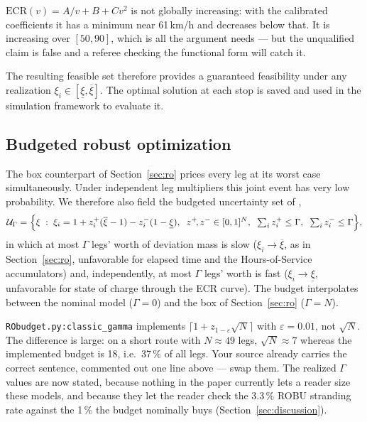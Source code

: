\begin{acode}
$\mathrm{ECR}(v) = A/v + B + Cv^2$ is not globally increasing: with the calibrated
coefficients it has a minimum near 61\,km/h and decreases below that. It is
increasing over $[50,90]$, which is all the argument needs --- but the unqualified
claim is false and a referee checking the functional form will catch it.
\end{acode}

The resulting feasible set therefore provides a guaranteed feasibility under any realization $\xi_i \in {[\underline\xi, \overline\xi]}$.
The optimal solution at each stop is saved and used in the simulation framework to evaluate it.

\subsection{Budgeted robust optimization} \label{sec:robu}
The box counterpart of Section~\ref{sec:ro} prices every leg at its worst case simultaneously. Under independent leg multipliers this joint event has very low probability. We therefore also field the budgeted uncertainty set of \citet{bertsimas_price_2004},
\[
  \mathcal U_\Gamma = \Bigl\{ \xi \;:\; \xi_i = 1 + z_i^{+}(\overline\xi - 1) - z_i^{-}(1-\underline\xi),
  \;\; z^{+}\!, z^{-} \in [0,1]^N,
  \;\; \textstyle\sum_i z_i^{+} \le \Gamma,
  \;\; \sum_i z_i^{-} \le \Gamma \Bigr\},
\]
in which at most $\Gamma$ legs' worth of deviation mass is slow ($\xi_i \to \overline\xi$, as in Section~\ref{sec:ro}, unfavorable for elapsed time and the Hours-of-Service accumulators) and, independently, at most $\Gamma$ legs' worth is fast ($\xi_i \to \underline\xi$, unfavorable for state of charge through the ECR curve).
The budget interpolates between the nominal model ($\Gamma = 0$) and the box of Section~\ref{sec:ro} ($\Gamma = N$).

\begin{acode}
\texttt{RObudget.py:classic\_gamma} implements
$\lceil 1 + z_{1-\varepsilon}\sqrt N\rceil$ with $\varepsilon = 0.01$, not
$\sqrt N$. The difference is large: on a short route with $N \approx 49$ legs,
$\sqrt N \approx 7$ whereas the implemented budget is 18, i.e.\ 37\,\% of all
legs. Your source already carries the correct sentence, commented out one line
above --- swap them. The realized $\Gamma$ values are now stated, because nothing
in the paper currently lets a reader size these models, and because they let the
reader check the 3.3\,\% ROBU stranding rate against the 1\,\% the budget
nominally buys (Section~\ref{sec:discussion}).
\end{acode}

